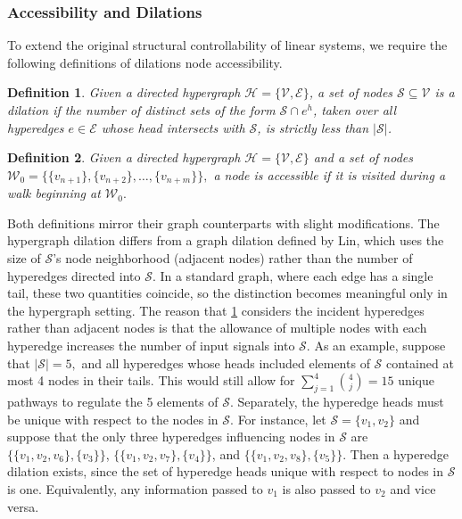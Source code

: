 \documentclass[journal,twoside,web]{ieeecolor}
\newtheorem{definition}{Definition}
\newcommand{\Es}{\mathcal{E}}
\newcommand{\Hs}{\mathcal{H}}
\newcommand{\Ss}{\mathcal{S}}
\newcommand{\Vs}{\mathcal{V}}
\newcommand{\Ws}{\mathcal{W}}
\begin{document}
\subsubsection{Accessibility and Dilations}\label{sec: structural properties}
To extend the original structural controllability of linear systems, we require the following definitions of dilations node accessibility.


\begin{definition}\label{def: hyperedge dilation}
Given a directed  hypergraph $\Hs=\{\Vs,\Es\}$, 
a set of nodes $\Ss\subseteq\Vs$ is a dilation if the number of distinct sets of the form $\Ss\cap e^h$, taken over all hyperedges $e\in\Es$ whose head intersects with $\Ss$, is strictly less than $|\Ss|$.

\end{definition}



\begin{definition}
    Given a directed  hypergraph $\Hs=\{\Vs,\Es\}$ and a set of nodes $\Ws_0=\{\{v_{n+1}\},\{v_{n+2}\},\dots,\{v_{n+m}\}\},$ a node is accessible if it is visited during a walk beginning at $\Ws_0.$
\end{definition}



Both definitions mirror their graph counterparts with slight modifications.
%
The hypergraph dilation differs from a graph dilation defined by Lin, which uses the size of $\Ss$'s node neighborhood (adjacent nodes) rather than the number of hyperedges directed into $\Ss$.
%
In a standard graph, where each edge has a single tail, these two quantities coincide, so the distinction becomes meaningful only in the hypergraph setting.
%
The reason that \cref{def: hyperedge dilation} considers the incident hyperedges rather than adjacent nodes is that the allowance of multiple nodes with each hyperedge increases the number of input signals into $\Ss.$
%
As an example, suppose that $|\Ss|=5,$ and all hyperedges whose heads included elements of $\Ss$ contained at most 4 nodes in their tails.
%
This would still allow for $\sum_{j=1}^4\binom{4}{j}=15$ unique pathways to regulate the 5 elements of $\Ss$.
%
Separately, the hyperedge heads must be unique with respect to the nodes in $\Ss.$
%
For instance, let $\Ss=\{v_1,v_2\}$ and suppose that the only three hyperedges influencing nodes in $\Ss$ are $\{\{v_1,v_2,v_6\},\{v_3\}\}$, $\{\{v_1,v_2,v_7\},\{v_4\}\}$, and $\{\{v_1,v_2,v_8\},\{v_5\}\}.$ 
%
Then a hyperedge dilation exists, since the set of hyperedge heads unique with respect to nodes in $\Ss$ is one.
%
Equivalently, any information passed to $v_1$ is also passed to $v_2$ and vice versa.
\end{document}
